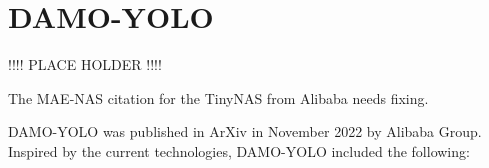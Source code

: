 \documentclass{article}
\begin{document}


\section{DAMO-YOLO}

!!!! PLACE HOLDER !!!!

The MAE-NAS citation for the TinyNAS from Alibaba needs fixing.


DAMO-YOLO \cite{xu2022damo} was published in ArXiv in November 2022 by Alibaba Group. Inspired by the current technologies, DAMO-YOLO included the following:
\end{document}
